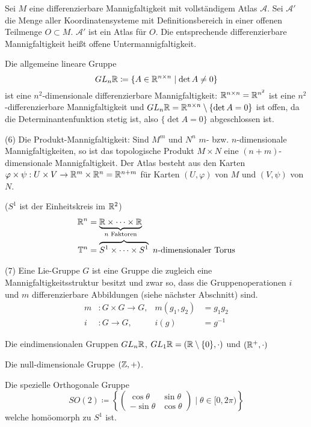\documentclass[a4paper,twoside,DIV15,BCOR12mm]{scrbook}
\newcommand{\At}{\mathcal A}
\renewcommand{\da}{\coloneqq}
\begin{document}
\begin{beispiele}
Sei $M$ eine differenzierbare Mannigfaltigkeit mit vollständigem Atlas $\At$. Sei $\At'$ die Menge aller Koordinatensysteme mit Definitionsbereich in einer offenen Teilmenge $O\subset M$. $\At'$ ist ein Atlas für $O$. Die entsprechende differenzierbare Mannigfaltigkeit heißt offene Untermannigfaltigkeit.

\begin{beispiel}
Die allgemeine lineare Gruppe
\[ GL_n\MdR \da \{ A \in \MdR^{n\times n} \mid \det A \ne 0 \} \]
ist eine $n^2$-dimensionale differenzierbare Mannigfaltigkeit:
$\mathbb{R}^{n\times n} = \mathbb{R}^{n^2}$ ist eine $n^2$-differenzierbare Mannigfaltigkeit und $GL_n\mathbb{R} = \mathbb{R}^{n\times n} \setminus \{\det A = 0\}$ ist offen, da die Determinantenfunktion stetig ist, also  $\{\det A = 0\}$ abgeschlossen ist.
\end{beispiel}

\item[(6)] Die Produkt-Mannigfaltigkeit:
Sind $M^m$ und $N^n$ $m$- bzw. $n$-dimensionale Mannigfaltigkeiten, so ist das topologische Produkt $M\times N$ eine $(n+m)$-dimensionale Mannigfaltigkeit. Der Atlas besteht aus den Karten $\varphi\times \psi: U\times V \to \mathbb{R}^m\times\mathbb{R}^n = \mathbb{R}^{n+m}$ für Karten $(U,\varphi)$ von $M$ und $(V,\psi)$ von $N$.

\begin{beispiel}
($S^1$ ist der Einheitskreis im $\mathbb{R}^2$)
\begin{align*}
\mathbb{R}^n &= \underbrace{\mathbb{R}\times \cdots \times \mathbb{R}}_{\text{$n$ Faktoren}} \\
\mathbb{T}^n &= \overbrace{S^1\times \cdots \times S^1} \text{ $n$-dimensionaler Torus}
\end{align*}
\end{beispiel}

\item[(7)] Eine Lie-Gruppe $G$ ist eine Gruppe die zugleich eine Mannigfaltigkeitsstruktur besitzt und zwar so, dass die Gruppenoperationen $i$ und $m$ differenzierbare Abbildungen (siehe nächster Abschnitt) sind. 
\begin{align*}
m&: G\times G \to G , &m(g_1,g_2) &= g_1g_2 \\
i&: G \to G , &i(g) &= g^{-1} 
\end{align*}
\begin{beispiele}
\item Die eindimensionalen Gruppen $GL_n\mathbb{R}$, $GL_1\mathbb{R} = (\mathbb{R}\setminus\{0\},\cdot)$ und  $(\mathbb{R}^+,\cdot)$ 
\item Die null-dimensionale Gruppe $(\mathbb{Z},+)$.
\item Die spezielle Orthogonale Gruppe 
\[ SO(2) \da \left\{
\begin{pmatrix}
\cos \theta & \sin \theta \\ -\sin \theta & \cos \theta \end{pmatrix} \mid \theta \in [0,2\pi) \right\} \]
welche homöomorph zu $S^1$ ist.


\end{beispiele}
\end{beispiele}
\end{document}
